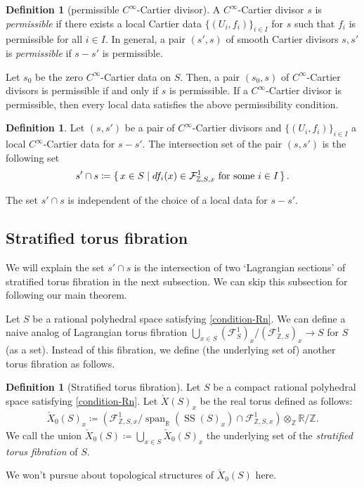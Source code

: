 \documentclass[a4paper,dvipdfmx,reqno,12pt]{amsart}
\theoremstyle{definition}
\newtheorem{definition}[theorem]{Definition}
\newcommand{\deq}{\coloneqq}
\newcommand{\Z}{\mathbb{Z}}%
\newcommand{\opn}[1]{\operatorname{#1}}
\numberwithin{equation}{section}
\begin{document}
\begin{definition}[{permissible $C^{\infty}$-Cartier divisor}]
\label{definition-permissible-smooth-cartier-divisor}
A $C^{\infty}$-Cartier divisor $s$ is \emph{permissible} 
if there exists a local Cartier data $\{(U_i,f_i)\}_{i\in I}$ 
for $s$
such that $f_i$ is permissible for all $i\in I$. 
In general, a pair $(s',s)$ of smooth 
Cartier divisors $s,s'$ is 
\emph{permissible} if $s-s'$ is 
permissible. 
\end{definition}

Let $s_0$ be the zero $C^{\infty}$-Cartier data on $S$. 
Then, a pair $(s_0,s)$ of $C^{\infty}$-Cartier divisors 
is permissible if and only if $s$ is permissible.
If a $C^{\infty}$-Cartier divisor is permissible, 
then every local data satisfies the above 
permissibility condition.

\begin{definition}
Let $(s,s')$ be a pair of $C^{\infty}$-Cartier divisors and 
$\{(U_i,f_i)\}_{i\in I}$ a local $C^{\infty}$-Cartier data
for $s-s'$. The intersection set of the pair 
$(s,s')$ is the following set
\begin{align}
s'\cap s\deq \set{x\in S \mid  df_i(x)\in 
\mathcal{F}^{1}_{\mathbb{Z},S,x} 
\text{ for some } i\in I}.
\end{align}
\end{definition}

The set $s'\cap s$ is independent of the choice of 
a local data for $s-s'$. 

\subsection{Stratified torus fibration}
\label{section-stratified-torus-fibration}
We will explain the set $s'\cap s$ is the 
intersection of two `Lagrangian sections' of
stratified torus fibration in the next subsection.
We can skip this subsection for following 
our main theorem.  

Let $S$ be a rational polyhedral space satisfying
\cref{condition-Rn}.
We can define a naive analog of Lagrangian torus 
fibration 
$\bigcup_{x\in S}(\mathcal{F}^{1}_{S})_x/
(\mathcal{F}^{1}_{\mathbb{Z},S})_x \to S$
for $S$ (as a set). Instead of this fibration, 
we define (the underlying set of) 
another torus fibration as follows. 
\begin{definition}[{Stratified torus fibration}]
Let $S$ be a compact rational polyhedral space 
satisfying \cref{condition-Rn}.
Let $\check{X}(S)_x$ be 
the real torus defined as follows:
\begin{align}
\check{X}_0(S)_x\deq  
(\mathcal{F}_{\mathbb{Z},S,x}^{1}/\opn{span}_{{\mathbb{R}}}
(\opn{SS}(S)_x)\cap \mathcal{F}_{\mathbb{Z},S,x}^{1})\otimes_{\Z} {\mathbb{R}}/\Z.
\end{align}
We call the union $\check{X}_0(S)\deq \bigcup_{x\in S}
\check{X}_0(S)_x$
the underlying set of the \emph{stratified torus 
fibration} of $S$.
\end{definition}
We won't pursue about
topological structures of $\check{X}_0(S)$ 
here.
\end{document}

